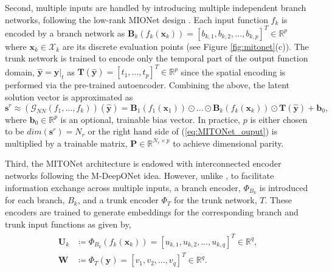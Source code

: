 \documentclass[draft]{agujournal2019}
\begin{document}
Second, multiple inputs are handled by introducing multiple independent branch networks, following the low-rank MIONet design \cite{jin2022mionet}. Each input function $f_k$ is encoded by a branch network as $\mathbf{B}_k(f_k(\mathbf{x}_{k}))=[b_{k,1}, b_{k,2}, \dots, b_{k,p}]^T \in \mathbb{R}^p$ where $\mathbf{x}_{k} \in \mathcal{X}_k$ are its discrete evaluation points (see Figure \ref{fig:mitonet}(c)). The trunk network is trained to encode only the temporal part of the output function domain, $\widehat{\mathbf{y}} = \mathbf{y}\vert_t$ as $\mathbf{T}(\widehat{\mathbf{y}}) = [t_1, \ldots, t_p]^T \in \mathbb{R}^p$ since the spatial encoding is performed via the pre-trained autoencoder. Combining the above, the latent solution vector is approximated as
\begin{equation}\label{eq:MITONet_ouput}
\mathbf{s}^r \approx (\mathcal{G}_{NN}(f_1, \ldots, f_k))(\widehat{\mathbf{y}}) = \mathbf{B}_1(f_1(\mathbf{x}_1)) \odot \ldots \odot \mathbf{B}_k(f_k(\mathbf{x}_k)) \odot \mathbf{T}(\widehat{\mathbf{y}}) + \mathbf{b}_0,
\end{equation}
where $\mathbf{b}_0 \in \mathbb{R}^p$ is an optional, trainable bias vector. In practice, $p$ is either chosen to be $dim(\mathbf{s}^r) = N_r$ or the right hand side of (\ref{eq:MITONet_ouput}) is multiplied by a trainable matrix, $\mathbf{P} \in \mathbb{R}^{N_r \times p}$ to achieve dimensional parity.

Third, the MITONet architecture is endowed with interconnected encoder networks following the M-DeepONet idea. However, unlike , to facilitate information exchange across multiple inputs, a branch encoder, $\Phi_{B_k}$ is introduced for each branch, $B_k$, and a trunk encoder $\Phi_{T}$ for the trunk network, $T$. These encoders are trained to generate embeddings for the corresponding branch and trunk input functions as given by, 
\begin{eqnarray}
\begin{split}
\mathbf{U}_k &\coloneq \Phi_{B_k}(f_k(\mathbf{x}_k)) = [u_{k,1}, u_{k,2}, \dots, u_{k,q}]^T \in \mathbb{R}^q, \\
\mathbf{W} &\coloneq \Phi_{T}(\mathbf{y}) = [v_1, v_2, \dots, v_q]^T \in \mathbb{R}^q.
\label{eq:MITONet_encoder}
\end{split}
\end{eqnarray}
\end{document}
